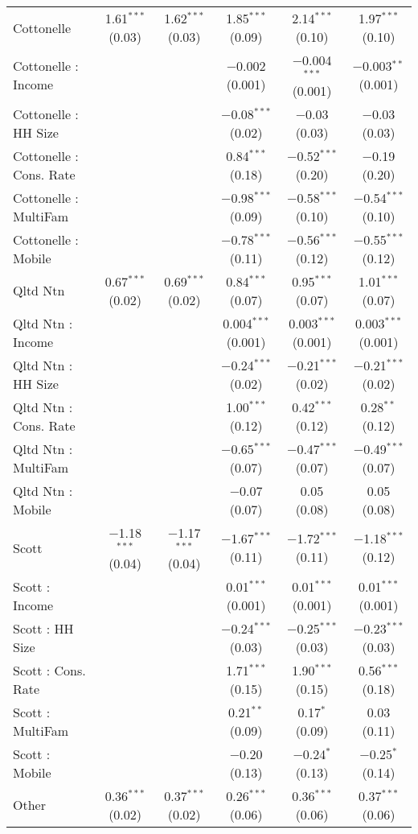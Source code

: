 \begin{table}[!htbp]
\begin{tabular}{@{\extracolsep{5pt}}lccccc}
  Cottonelle & 1.61$^{***}$ (0.03) & 1.62$^{***}$ (0.03) & 1.85$^{***}$ (0.09) & 2.14$^{***}$ (0.10) & 1.97$^{***}$ (0.10) \\ 
  Cottonelle : Income &  &  & $-$0.002 (0.001) & $-$0.004$^{***}$ (0.001) & $-$0.003$^{**}$ (0.001) \\ 
  Cottonelle : HH Size &  &  & $-$0.08$^{***}$ (0.02) & $-$0.03 (0.03) & $-$0.03 (0.03) \\ 
  Cottonelle : Cons. Rate &  &  & 0.84$^{***}$ (0.18) & $-$0.52$^{***}$ (0.20) & $-$0.19 (0.20) \\ 
  Cottonelle : MultiFam &  &  & $-$0.98$^{***}$ (0.09) & $-$0.58$^{***}$ (0.10) & $-$0.54$^{***}$ (0.10) \\ 
  Cottonelle : Mobile &  &  & $-$0.78$^{***}$ (0.11) & $-$0.56$^{***}$ (0.12) & $-$0.55$^{***}$ (0.12) \\ 
  Qltd Ntn & 0.67$^{***}$ (0.02) & 0.69$^{***}$ (0.02) & 0.84$^{***}$ (0.07) & 0.95$^{***}$ (0.07) & 1.01$^{***}$ (0.07) \\ 
  Qltd Ntn : Income &  &  & 0.004$^{***}$ (0.001) & 0.003$^{***}$ (0.001) & 0.003$^{***}$ (0.001) \\ 
  Qltd Ntn : HH Size &  &  & $-$0.24$^{***}$ (0.02) & $-$0.21$^{***}$ (0.02) & $-$0.21$^{***}$ (0.02) \\ 
  Qltd Ntn : Cons. Rate &  &  & 1.00$^{***}$ (0.12) & 0.42$^{***}$ (0.12) & 0.28$^{**}$ (0.12) \\ 
  Qltd Ntn : MultiFam &  &  & $-$0.65$^{***}$ (0.07) & $-$0.47$^{***}$ (0.07) & $-$0.49$^{***}$ (0.07) \\ 
  Qltd Ntn : Mobile &  &  & $-$0.07 (0.07) & 0.05 (0.08) & 0.05 (0.08) \\ 
  Scott & $-$1.18$^{***}$ (0.04) & $-$1.17$^{***}$ (0.04) & $-$1.67$^{***}$ (0.11) & $-$1.72$^{***}$ (0.11) & $-$1.18$^{***}$ (0.12) \\ 
  Scott : Income &  &  & 0.01$^{***}$ (0.001) & 0.01$^{***}$ (0.001) & 0.01$^{***}$ (0.001) \\ 
  Scott : HH Size &  &  & $-$0.24$^{***}$ (0.03) & $-$0.25$^{***}$ (0.03) & $-$0.23$^{***}$ (0.03) \\ 
  Scott : Cons. Rate &  &  & 1.71$^{***}$ (0.15) & 1.90$^{***}$ (0.15) & 0.56$^{***}$ (0.18) \\ 
  Scott : MultiFam &  &  & 0.21$^{**}$ (0.09) & 0.17$^{*}$ (0.09) & 0.03 (0.11) \\ 
  Scott : Mobile &  &  & $-$0.20 (0.13) & $-$0.24$^{*}$ (0.13) & $-$0.25$^{*}$ (0.14) \\ 
  Other & 0.36$^{***}$ (0.02) & 0.37$^{***}$ (0.02) & 0.26$^{***}$ (0.06) & 0.36$^{***}$ (0.06) & 0.37$^{***}$ (0.06) \\ 

\end{tabular}
\end{table}
